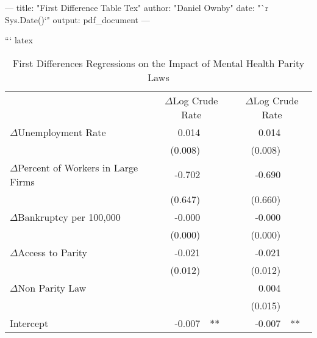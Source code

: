 ---
title: "First Difference Table Tex"
author: "Daniel Ownby"
date: "`r Sys.Date()`"
output: pdf_document
---

``` latex
\begin{table}[!h]
\caption{First Differences Regressions on the Impact of Mental Health Parity Laws}
\centering
\begin{tabular}{lllll}
\cline{1-5}
\multicolumn{1}{r}{} &
  \multicolumn{2}{c}{$\Delta$Log Crude Rate} &
  \multicolumn{2}{c}{$\Delta$Log Crude Rate} \\
\cline{1-5}
\multicolumn{1}{l}{$\Delta$Unemployment Rate} &
  \multicolumn{1}{r}{0.014} &
  \multicolumn{1}{l}{} &
  \multicolumn{1}{r}{0.014} &
  \multicolumn{1}{l}{} \\
\multicolumn{1}{l}{} &
  \multicolumn{1}{r}{(0.008)} &
  \multicolumn{1}{l}{} &
  \multicolumn{1}{r}{(0.008)} &
  \multicolumn{1}{l}{} \\
\multicolumn{1}{l}{$\Delta$Percent of Workers in Large Firms} &
  \multicolumn{1}{r}{-0.702} &
  \multicolumn{1}{l}{} &
  \multicolumn{1}{r}{-0.690} &
  \multicolumn{1}{l}{} \\
\multicolumn{1}{l}{} &
  \multicolumn{1}{r}{(0.647)} &
  \multicolumn{1}{l}{} &
  \multicolumn{1}{r}{(0.660)} &
  \multicolumn{1}{l}{} \\
\multicolumn{1}{l}{$\Delta$Bankruptcy per 100,000} &
  \multicolumn{1}{r}{-0.000} &
  \multicolumn{1}{l}{} &
  \multicolumn{1}{r}{-0.000} &
  \multicolumn{1}{l}{} \\
\multicolumn{1}{l}{} &
  \multicolumn{1}{r}{(0.000)} &
  \multicolumn{1}{l}{} &
  \multicolumn{1}{r}{(0.000)} &
  \multicolumn{1}{l}{} \\
\multicolumn{1}{l}{$\Delta$Access to Parity} &
  \multicolumn{1}{r}{-0.021} &
  \multicolumn{1}{l}{} &
  \multicolumn{1}{r}{-0.021} &
  \multicolumn{1}{l}{} \\
\multicolumn{1}{l}{} &
  \multicolumn{1}{r}{(0.012)} &
  \multicolumn{1}{l}{} &
  \multicolumn{1}{r}{(0.012)} &
  \multicolumn{1}{l}{} \\
\multicolumn{1}{l}{$\Delta$Non Parity Law} &
  \multicolumn{1}{r}{} &
  \multicolumn{1}{l}{} &
  \multicolumn{1}{r}{0.004} &
  \multicolumn{1}{l}{} \\
\multicolumn{1}{l}{} &
  \multicolumn{1}{r}{} &
  \multicolumn{1}{l}{} &
  \multicolumn{1}{r}{(0.015)} &
  \multicolumn{1}{l}{} \\
\multicolumn{1}{l}{Intercept} &
  \multicolumn{1}{r}{-0.007} &
  \multicolumn{1}{l}{**} &
  \multicolumn{1}{r}{-0.007} &
  \multicolumn{1}{l}{**} \\

\end{tabular}
\end{table}
